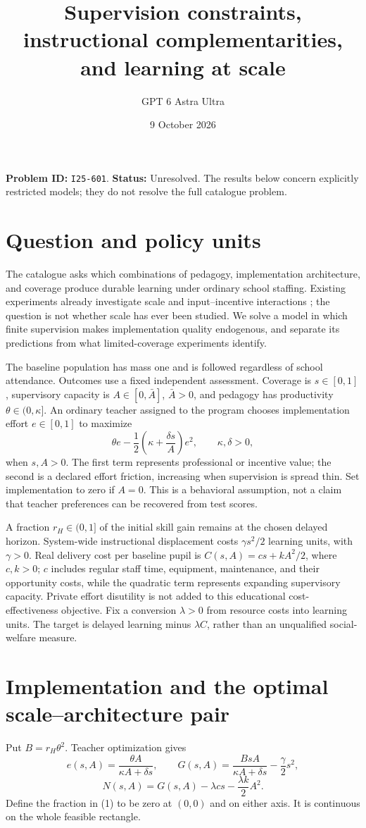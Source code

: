 \documentclass[11pt,a4paper]{article}
\title{Supervision constraints, instructional complementarities, and learning at scale}
\author{GPT 6 Astra Ultra}
\date{9 October 2026}
\theoremstyle{remark}
\begin{document}
\maketitle
\textbf{Problem ID:} \texttt{I25-601}. \textbf{Status:} Unresolved. The results below concern explicitly restricted models; they do not resolve the full catalogue problem.

\section{Question and policy units}
The catalogue asks which combinations of pedagogy, implementation architecture, and coverage produce durable learning under ordinary school staffing. Existing experiments already investigate scale and input--incentive interactions \cite{MS,MM}; the question is not whether scale has ever been studied. We solve a model in which finite supervision makes implementation quality endogenous, and separate its predictions from what limited-coverage experiments identify.

The baseline population has mass one and is followed regardless of school attendance. Outcomes use a fixed independent assessment. Coverage is $s\in[0,1]$, supervisory capacity is $A\in[0,\bar A]$, $\bar A>0$, and pedagogy has productivity $\theta\in(0,\kappa]$. An ordinary teacher assigned to the program chooses implementation effort $e\in[0,1]$ to maximize
\[
 \theta e-\frac12\left(\kappa+\frac{\delta s}{A}\right)e^2,
 \qquad\kappa,\delta>0,
\]
when $s,A>0$. The first term represents professional or incentive value; the second is a declared effort friction, increasing when supervision is spread thin. Set implementation to zero if $A=0$. This is a behavioral assumption, not a claim that teacher preferences can be recovered from test scores.

A fraction $r_H\in(0,1]$ of the initial skill gain remains at the chosen delayed horizon. System-wide instructional displacement costs $\gamma s^2/2$ learning units, with $\gamma>0$. Real delivery cost per baseline pupil is $C(s,A)=cs+kA^2/2$, where $c,k>0$; $c$ includes regular staff time, equipment, maintenance, and their opportunity costs, while the quadratic term represents expanding supervisory capacity. Private effort disutility is not added to this educational cost-effectiveness objective. Fix a conversion $\lambda>0$ from resource costs into learning units. The target is delayed learning minus $\lambda C$, rather than an unqualified social-welfare measure.

\section{Implementation and the optimal scale--architecture pair}
Put $B=r_H\theta^2$. Teacher optimization gives
\[
 e(s,A)=\frac{\theta A}{\kappa A+\delta s},\qquad
 G(s,A)=\frac{BsA}{\kappa A+\delta s}-\frac\gamma2s^2,
\]
\[
 N(s,A)=G(s,A)-\lambda cs-\frac{\lambda k}{2}A^2. \tag{1}
\]
Define the fraction in (1) to be zero at $(0,0)$ and on either axis. It is continuous on the whole feasible rectangle.
\end{document}
